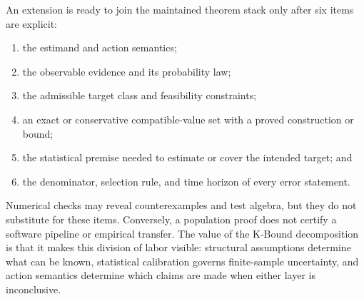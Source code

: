 An extension is ready to join the maintained theorem stack only after six items are explicit:
\begin{enumerate}
  \item the estimand and action semantics;
  \item the observable evidence and its probability law;
  \item the admissible target class and feasibility constraints;
  \item an exact or conservative compatible-value set with a proved construction or bound;
  \item the statistical premise needed to estimate or cover the intended target; and
  \item the denominator, selection rule, and time horizon of every error statement.
\end{enumerate}
Numerical checks may reveal counterexamples and test algebra, but they do not substitute for these
items.  Conversely, a population proof does not certify a software pipeline or empirical transfer.
The value of the K-Bound decomposition is that it makes this division of labor visible: structural
assumptions determine what can be known, statistical calibration governs finite-sample uncertainty,
and action semantics determine which claims are made when either layer is inconclusive.

